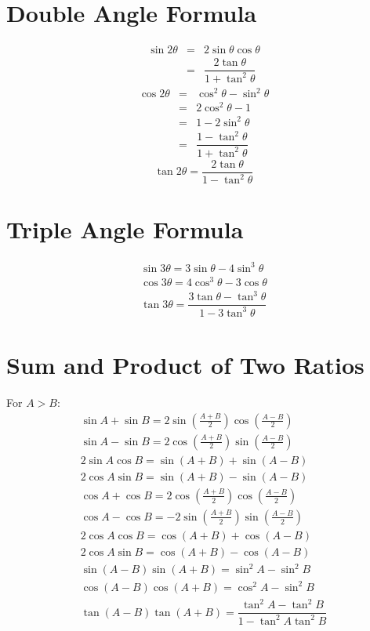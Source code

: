 \section{Double Angle Formula}
\begin{equation}
	\begin{aligned}
			\sin 2\theta &=& 2\sin \theta \cos \theta\\
			&=&\dfrac{2 \tan \theta}{1+\tan^2 \theta}
	\end{aligned}
\end{equation}
\begin{equation}
	\begin{aligned}
			\cos 2\theta &=& \cos^2 \theta -\sin^2 \theta\\
			&=&2\cos^2 \theta-1\\
			&=&1-2\sin^2 \theta\\
			&=&\dfrac{1-\tan^2 \theta}{1+\tan^2 \theta}
	\end{aligned}
\end{equation}
\begin{equation}
	\tan 2\theta=\dfrac{2 \tan \theta}{1-\tan^2 \theta}
\end{equation}


\section{Triple Angle Formula}
\begin{align}
	\sin 3\theta=3\sin \theta-4 \sin^3 \theta\\
	\cos 3\theta=4\cos^3 \theta-3 \cos \theta\\
	\tan 3\theta=\dfrac{3\tan \theta -\tan^3 \theta}{1-3\tan^3 \theta}
\end{align}


\section{Sum and Product of Two Ratios}
For $A>B$:
\begin{align}
	\sin A+\sin B=2 \sin \left(\frac{A+B}{2}\right)\cos \left(\frac{A-B}{2}\right)\\
	\sin A-\sin B=2 \cos \left(\frac{A+B}{2}\right)\sin \left(\frac{A-B}{2}\right)\\
	2\sin A\cos B=\sin(A+B)+\sin(A-B)\\
	2\cos A\sin B=\sin(A+B)-\sin(A-B)\\
	\cos A+\cos B=2 \cos \left(\frac{A+B}{2}\right)\cos \left(\frac{A-B}{2}\right)\\
	\cos A-\cos B=-2 \sin \left(\frac{A+B}{2}\right)\sin \left(\frac{A-B}{2}\right)\\
	2 \cos A\cos B=\cos (A+B)+\cos (A-B)\\
	2 \cos A\sin B=\cos (A+B)-\cos (A-B)\\
	\sin (A-B)\sin(A+B)=\sin^2 A-\sin^2 B\\
	\cos (A-B)\cos(A+B)=\cos^2 A-\sin^2 B\\
	\tan (A-B)\tan(A+B)=\dfrac{\tan^2 A-\tan^2 B}{1-\tan^2 A\tan^2 B}
\end{align}


